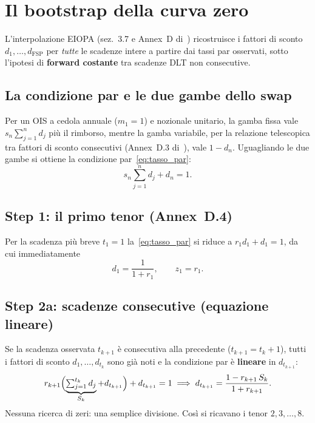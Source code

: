 \documentclass[11pt,a4paper]{article}
\theoremstyle{plain}
\theoremstyle{definition}
\theoremstyle{remark}
\newcommand{\FSP}{\mathrm{FSP}}
\begin{document}
\section{Il bootstrap della curva zero}
\label{sec:bootstrap}

L'interpolazione EIOPA (sez.~3.7 e Annex~D di~\cite{eiopa2026}) ricostruisce i fattori
di sconto $d_1,\dots,d_{\FSP}$ per \emph{tutte} le scadenze intere a partire dai tassi
par osservati, sotto l'ipotesi di \textbf{forward costante} tra scadenze DLT non
consecutive.

\subsection{La condizione par e le due gambe dello swap}

Per un OIS a cedola annuale ($m_1=1$) e nozionale unitario, la gamba fissa vale
$s_n \sum_{j=1}^{n} d_j$ pi\`u il rimborso, mentre la gamba variabile, per la relazione
telescopica tra fattori di sconto consecutivi (Annex~D.3 di~\cite{eiopa2026}), vale
$1 - d_n$. Uguagliando le due gambe si ottiene la condizione par~\eqref{eq:tasso_par}:
\[
  s_n \sum_{j=1}^{n} d_j + d_n = 1.
\]

\subsection{Step 1: il primo tenor (Annex~D.4)}

Per la scadenza pi\`u breve $t_1 = 1$ la~\eqref{eq:tasso_par} si riduce a
$r_1 d_1 + d_1 = 1$, da cui immediatamente
\begin{equation}
  \label{eq:step1}
  d_1 = \frac{1}{1+r_1}, \qquad z_1 = r_1.
\end{equation}

\subsection{Step 2a: scadenze consecutive (equazione lineare)}

Se la scadenza osservata $t_{k+1}$ \`e consecutiva alla precedente ($t_{k+1}=t_k+1$),
tutti i fattori di sconto $d_1,\dots,d_{t_k}$ sono gi\`a noti e la condizione par
\`e \textbf{lineare} in $d_{t_{k+1}}$:
\begin{equation}
  \label{eq:step2_lin}
  r_{k+1}\Bigl(\underbrace{\textstyle\sum_{j=1}^{t_k} d_j}_{S_k} + d_{t_{k+1}}\Bigr)
  + d_{t_{k+1}} = 1
  \;\Longrightarrow\;
  d_{t_{k+1}} = \frac{1 - r_{k+1}\,S_k}{1 + r_{k+1}}.
\end{equation}
Nessuna ricerca di zeri: una semplice divisione. Cos\`i si ricavano i tenor
$2,3,\dots,8$.
\end{document}
